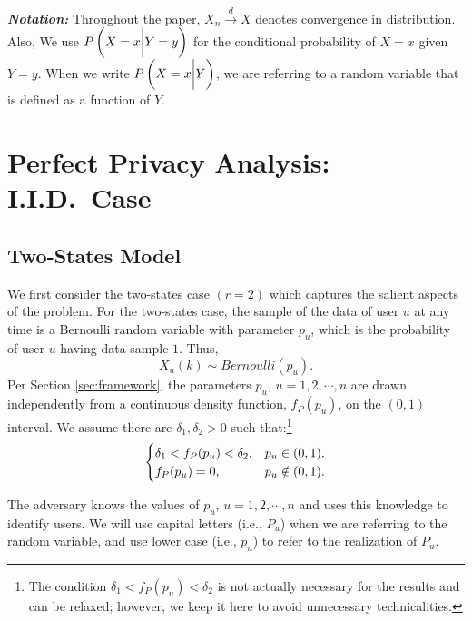 \textbf{\textit{Notation:}} Throughout the paper, $X_n \xrightarrow{d} X$ denotes convergence in distribution. Also, We use $P\left(X=x\bigg{|} Y=y\right)$ for the conditional probability of $X=x$ given $Y=y$. When we write $P\left(X=x \bigg{|}Y\right)$, we are referring to a random variable that is defined as a function of $Y$.


\section{Perfect Privacy Analysis: I.I.D.\ Case}
\label{perfectsec}

\subsection{Two-States Model}

We first consider the two-states case $(r=2)$ which captures the salient aspects of the problem. For the two-states case, the sample of the data of user $u$ at any time is a Bernoulli random variable with parameter $p_u$, which is the probability of user $u$ having data sample $1$. Thus,
\[X_u(k) \sim Bernoulli \left(p_u\right).\]
Per Section \ref{sec:framework}, the parameters $p_u$, $u=1, 2, \cdots, n$ are drawn independently from a continuous density function, $f_P(p_u)$, on the $(0,1)$ interval. We assume there are $\delta_1, \delta_2>0$ such that:\footnote{The condition $\delta_1<f_P(p_u) <\delta_2$ is not actually necessary for the results and can be relaxed; however, we keep it here to avoid unnecessary technicalities.}
\begin{equation}
\nonumber\begin{cases}
    \delta_1<f_P(p_u) <\delta_2, & p_u \in (0,1).\\
    f_P(p_u)=0, &  p _u\notin (0,1).
\end{cases}
\end{equation}

The adversary knows the values of $p_u$, $u=1, 2, \cdots, n$ and uses this knowledge to identify users. We will use capital letters (i.e., $P_u$) when we are referring to the random variable, and use lower case (i.e., $p_u$) to refer to the realization of $P_u$.

